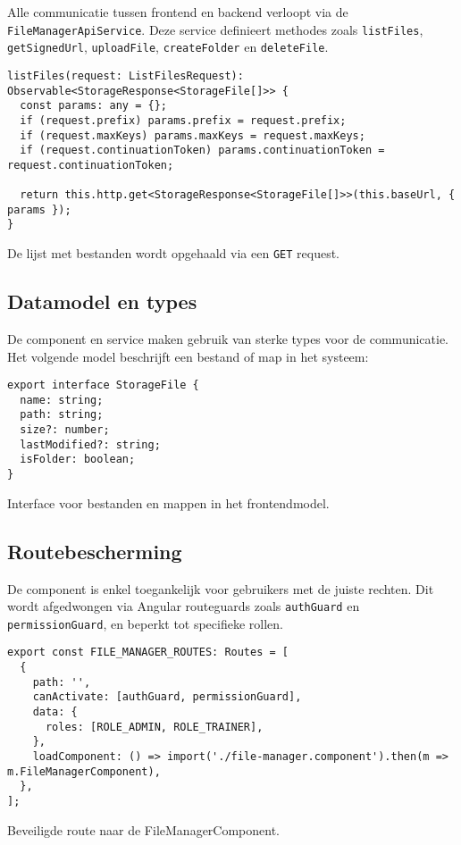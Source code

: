 Alle communicatie tussen frontend en backend verloopt via de \texttt{FileManagerApiService}. Deze service definieert methodes zoals \texttt{listFiles}, \texttt{getSignedUrl}, \texttt{uploadFile}, \texttt{createFolder} en \texttt{deleteFile}.

\begin{listing}[H]
\begin{verbatim}
listFiles(request: ListFilesRequest): Observable<StorageResponse<StorageFile[]>> {
  const params: any = {};
  if (request.prefix) params.prefix = request.prefix;
  if (request.maxKeys) params.maxKeys = request.maxKeys;
  if (request.continuationToken) params.continuationToken = request.continuationToken;

  return this.http.get<StorageResponse<StorageFile[]>>(this.baseUrl, { params });
}
\end{verbatim}
\caption[API-call naar de backend]{De lijst met bestanden wordt opgehaald via een \texttt{GET} request.}
\end{listing}

\subsection{Datamodel en types}

De component en service maken gebruik van sterke types voor de communicatie. Het volgende model beschrijft een bestand of map in het systeem:

\begin{listing}[H]
\begin{verbatim}
export interface StorageFile {
  name: string;
  path: string;
  size?: number;
  lastModified?: string;
  isFolder: boolean;
}
\end{verbatim}
\caption[Bestandstype in de frontend]{Interface voor bestanden en mappen in het frontendmodel.}
\end{listing}

\subsection{Routebescherming}

De component is enkel toegankelijk voor gebruikers met de juiste rechten. Dit wordt afgedwongen via Angular routeguards zoals \texttt{authGuard} en \texttt{permissionGuard}, en beperkt tot specifieke rollen.

\begin{listing}[H]
\begin{verbatim}
export const FILE_MANAGER_ROUTES: Routes = [
  {
    path: '',
    canActivate: [authGuard, permissionGuard],
    data: {
      roles: [ROLE_ADMIN, ROLE_TRAINER],
    },
    loadComponent: () => import('./file-manager.component').then(m => m.FileManagerComponent),
  },
];
\end{verbatim}
\caption[Routeconfiguratie]{Beveiligde route naar de FileManagerComponent.}
\end{listing}

